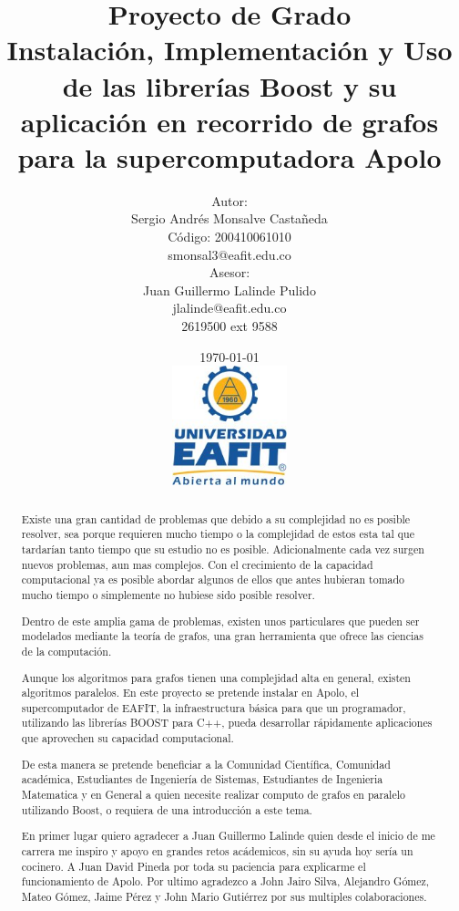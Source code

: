 \documentclass[twoside,letterpaper,12pt]{report}
\title{
Proyecto de Grado\\[0.5cm]
Instalación, Implementación y Uso de las librerías Boost y su aplicación en recorrido de grafos para la supercomputadora Apolo}
\author{
	Autor:\\[0.3cm]
	Sergio Andrés Monsalve Castañeda\\
	Código: 200410061010\\
	smonsal3@eafit.edu.co\\[0.7cm]
	Asesor: \\[0.3cm]
	Juan Guillermo Lalinde Pulido\\
	jlalinde@eafit.edu.co\\
	2619500 ext 9588%
}
\date{
	\today \\[0.5cm]
	\includegraphics[width=0.25\textwidth]{aux/logo_eafit}
}
\begin{document}
\maketitle

\tableofcontents


\begin{abstract}

Existe una gran cantidad de problemas que debido a su complejidad no es posible resolver, sea porque requieren mucho tiempo o la complejidad de estos esta tal que tardarían tanto tiempo que su estudio no es posible. Adicionalmente cada vez surgen nuevos problemas, aun mas complejos. Con el crecimiento de la capacidad computacional ya es posible abordar algunos de ellos que antes hubieran tomado mucho tiempo o simplemente no hubiese sido posible resolver. 

Dentro de este amplia gama de problemas, existen unos particulares que pueden ser modelados mediante la teoría de grafos, una gran herramienta que ofrece las ciencias de la computación.

Aunque los algoritmos para grafos tienen una complejidad alta en general, existen algoritmos paralelos. En este proyecto se pretende instalar en Apolo, el supercomputador de EAFIT, la infraestructura básica para que un programador, utilizando las librerías BOOST para C++, pueda desarrollar rápidamente aplicaciones que aprovechen su capacidad computacional. 

De esta manera se pretende beneficiar a la Comunidad Científica, Comunidad académica, Estudiantes de Ingeniería de Sistemas, Estudiantes de Ingenieria Matematica y en General a quien necesite realizar computo de grafos en paralelo utilizando Boost, o requiera de una introducción a este tema.


\end{abstract}

\newpage

\renewcommand{\abstractname}{Agradecimientos}
\begin{abstract}

En primer lugar quiero agradecer a Juan Guillermo Lalinde quien desde el inicio de me carrera me inspiro y apoyo en grandes retos acádemicos, sin su ayuda hoy sería un cocinero. A Juan David Pineda por toda su paciencia para explicarme el funcionamiento de Apolo. Por ultimo agradezco a John Jairo Silva, Alejandro Gómez, Mateo Gómez, Jaime Pérez y John Mario Gutiérrez por sus multiples colaboraciones. 

\end{abstract}
\end{document}
